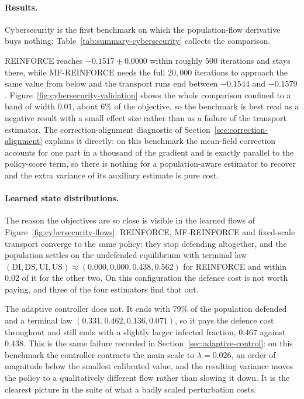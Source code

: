 \paragraph{Results.}
Cybersecurity is the first benchmark on which the population-flow derivative buys nothing; Table~\ref{tab:summary-cybersecurity} collects the comparison.



REINFORCE reaches $-0.1517\pm0.0000$ within roughly $500$ iterations and stays there, while MF-REINFORCE needs the full $20{,}000$ iterations to approach the same value from below and the transport runs end between $-0.1544$ and $-0.1579$. Figure~\ref{fig:cybersecurity-validation} shows the whole comparison confined to a band of width $0.01$, about $6\%$ of the objective, so the benchmark is best read as a negative result with a small effect size rather than as a failure of the transport estimator. The correction-alignment diagnostic of Section~\ref{sec:correction-alignment} explains it directly: on this benchmark the mean-field correction accounts for one part in a thousand of the gradient and is exactly parallel to the policy-score term, so there is nothing for a population-aware estimator to recover and the extra variance of its auxiliary estimate is pure cost.


\paragraph{Learned state distributions.}
The reason the objectives are so close is visible in the learned flows of Figure~\ref{fig:cybersecurity-flows}. REINFORCE, MF-REINFORCE and fixed-scale transport converge to the same policy: they stop defending altogether, and the population settles on the undefended equilibrium with terminal law $(\mathrm{DI},\mathrm{DS},\mathrm{UI},\mathrm{US})\approx(0.000,0.000,0.438,0.562)$ for REINFORCE and within $0.02$ of it for the other two. On this configuration the defence cost is not worth paying, and three of the four estimators find that out.

The adaptive controller does not. It ends with $79\%$ of the population defended and a terminal law $(0.331,0.462,0.136,0.071)$, so it pays the defence cost throughout and still ends with a slightly larger infected fraction, $0.467$ against $0.438$. This is the same failure recorded in Section~\ref{sec:adaptive-control}: on this benchmark the controller contracts the main scale to $\lambda=0.026$, an order of magnitude below the smallest calibrated value, and the resulting variance moves the policy to a qualitatively different flow rather than slowing it down. It is the clearest picture in the suite of what a badly scaled perturbation costs.

